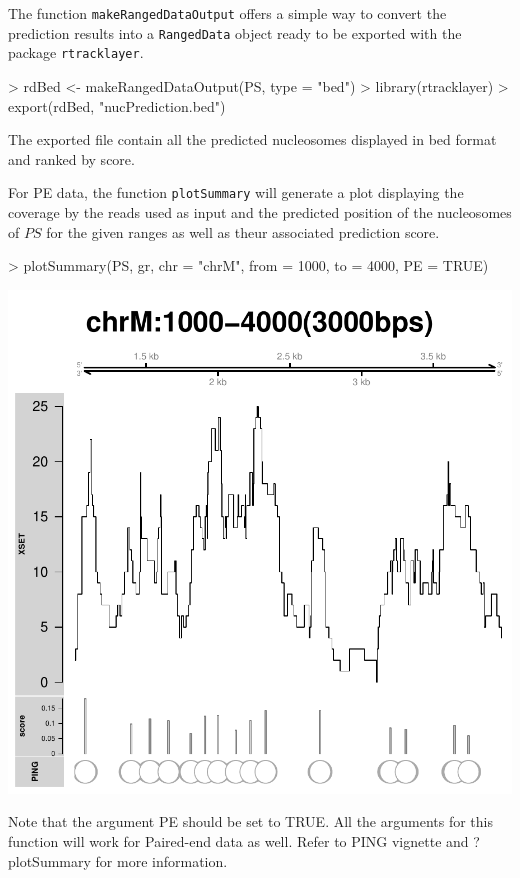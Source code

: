 \documentclass[11pt]{article}
\begin{document}
The function \texttt{makeRangedDataOutput} offers a simple way to convert the
prediction results into a \texttt{RangedData} object ready to be exported with
the package \texttt{rtracklayer}.

\begin{Schunk}
\begin{Sinput}
> rdBed <- makeRangedDataOutput(PS, type = "bed")
> library(rtracklayer)
> export(rdBed, "nucPrediction.bed")
\end{Sinput}
\end{Schunk}

The exported file contain all the predicted nucleosomes displayed in bed format
and ranked by score.

\vspace{10pt}
For PE data, the function \texttt{plotSummary} will generate a plot displaying 
the coverage by the reads used as input and the predicted position of the
nucleosomes of $PS$ for the given ranges as well as theur associated prediction score.

\begin{Schunk}
\begin{Sinput}
> plotSummary(PS, gr, chr = "chrM", from = 1000, to = 4000, PE = TRUE)
\end{Sinput}
\end{Schunk}
\includegraphics{PING-PE-plotSummary-PE}

Note that the argument PE should be set to TRUE. All the arguments for this function will work for Paired-end data as well. Refer to PING vignette and ?plotSummary for more information.
\end{document}
